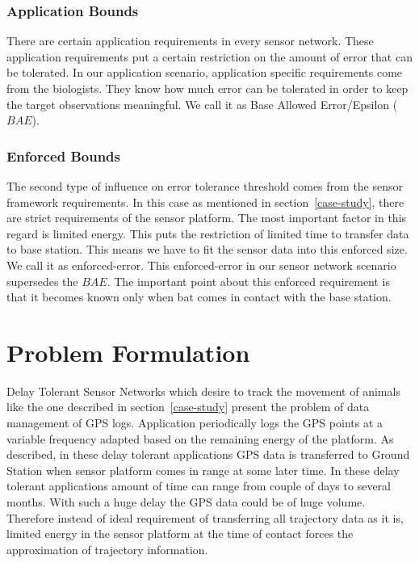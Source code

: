 \documentclass[conference]{IEEEtran}
\begin{document}
\subsubsection{Application Bounds}
There are certain application requirements in every sensor network. These application requirements 
put a certain restriction on the amount of error that can be tolerated. In our application scenario, 
application specific requirements come from the biologists. They know how much error can be tolerated 
in order to keep the target observations meaningful. We call it as Base Allowed Error/Epsilon ($BAE$).

\subsubsection{Enforced Bounds}
The second type of influence on error tolerance threshold comes from the sensor framework requirements. 
In this case as mentioned in section~\ref{case-study}, there are strict requirements of the sensor platform. 
The most important factor in this regard is limited energy. This puts the restriction of limited time to 
transfer data to base station. This means we have to fit the sensor data into this enforced size. We 
call it as enforced-error. This enforced-error in our sensor network scenario supersedes the $BAE$. 
%
The important point about this enforced requirement is that it becomes known only when bat comes 
in contact with the base station. 
\section{Problem Formulation}\label{sec:problem}

Delay Tolerant Sensor Networks which desire to track the movement of animals like the one described in 
section~\ref{case-study} present the problem of data management of GPS logs. Application periodically 
logs the GPS points at a variable frequency adapted based on the remaining energy of the platform. 
As described, in these delay tolerant applications GPS data is transferred to Ground Station when 
sensor platform comes in range at some later time. In these delay tolerant applications amount of time 
can range from couple of days to several months. With such a huge delay the GPS data could be of huge 
volume. Therefore instead of ideal requirement of transferring all trajectory data as it is, limited energy in 
the sensor platform at the time of contact forces the approximation of trajectory information. \\
\end{document}
